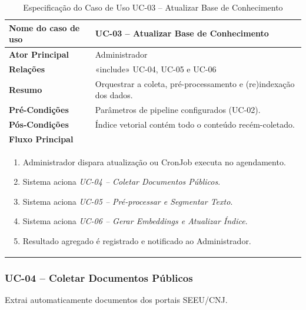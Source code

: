 \begin{table}[H]
\centering
\caption{Especificação do Caso de Uso UC-03 – Atualizar Base de Conhecimento}
\label{tab:uc03}
\begin{tabular}{|p{4cm}|p{11cm}|}
\hline
\textbf{Nome do caso de uso}     & UC-03 – Atualizar Base de Conhecimento \\ \hline
\textbf{Ator Principal}          & Administrador \\ \hline
\textbf{Relações}                & {\small «include» UC-04, UC-05 e UC-06} \\ \hline
\textbf{Resumo}                  & Orquestrar a coleta, pré-processamento e (re)indexação dos dados. \\ \hline
\textbf{Pré-Condições}           & Parâmetros de pipeline configurados (UC-02). \\ \hline
\textbf{Pós-Condições}           & Índice vetorial contém todo o conteúdo recém-coletado. \\ \hline
\multicolumn{2}{|l|}{\textbf{Fluxo Principal}} \\ \hline
\multicolumn{2}{|p{15cm}|}{%
  \begin{enumerate}[leftmargin=*]
    \item Administrador dispara atualização ou CronJob executa no agendamento.
    \item Sistema aciona \emph{UC-04 – Coletar Documentos Públicos}.
    \item Sistema aciona \emph{UC-05 – Pré-processar e Segmentar Texto}.
    \item Sistema aciona \emph{UC-06 – Gerar Embeddings e Atualizar Índice}.
    \item Resultado agregado é registrado e notificado ao Administrador.
  \end{enumerate}} \\ \hline
\end{tabular}
\end{table}

\subsubsection{UC-04 – Coletar Documentos Públicos}

\noindent
Extrai automaticamente documentos dos portais SEEU/CNJ.

